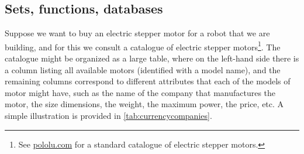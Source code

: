 

\subsection{Sets, functions, databases}

Suppose we want to buy an electric stepper motor for a robot that we are building, and for this we consult a catalogue of electric stepper motors\footnote{See \href{https://www.pololu.com/category/87/stepper-motors}{pololu.com} for a standard catalogue of electric stepper motors.}. The catalogue might be organized as a large table, where on the left-hand side there is a column listing all available motors (identified with a model name), and the remaining columns correspond to different attributes that each of the models of motor might have, such as the name of the company that manufactures the motor, the size dimensions, the weight, the maximum power, the price, etc. A simple illustration is provided in \cref{tab:currencycompanies}.
\begin{table}[h]
    \centering
    \caption{A simplified catalogue of motors.}
    \label{tab:currencycompanies}
\end{table}

